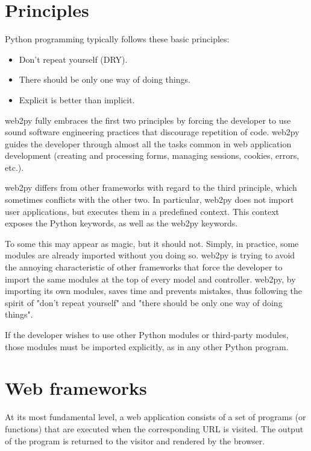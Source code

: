 \documentclass[justified,sixbynine,notoc]{tufte-book}
\def\inxx#1{\index{#1}}
\begin{document}
\begin{fullwidth}
\goodbreak\section{Principles}

Python programming typically follows these basic principles:
\begin{itemize}
\item Don't repeat yourself (DRY).

\item There should be only one way of doing things.

\item Explicit is better than implicit.
\end{itemize}
\noindent web2py fully embraces the first two principles by forcing the developer to use sound software
engineering practices that discourage repetition of code. web2py guides the developer through almost
all the tasks common in web application development (creating and processing forms, managing
sessions, cookies, errors, etc.).

\inxx{request}
web2py differs from other frameworks with regard to the third principle, which sometimes conflicts
with the other two. In particular, web2py does not import user applications, but executes them in a predefined context.  This context exposes the Python keywords, as well as the web2py keywords.

To some this may appear as magic, but it should not.
Simply, in practice, some modules are already imported without you doing so.
web2py is trying to avoid the annoying characteristic of
other frameworks that force the developer to import the same modules at the top of every model and
controller.
\noindent web2py, by importing its own modules, saves time and prevents mistakes, thus following the spirit of "don't repeat yourself"
and "there should be only one way of doing things".

If the developer wishes to use other Python modules or third-party modules, those
modules must be imported explicitly, as in any other Python program.

\goodbreak\section{Web frameworks}

\inxx{PHP} \inxx{ASP} \inxx{JSP}

At its most fundamental level, a web application consists of a set of programs (or functions) that are
executed when the corresponding URL is visited.
The output of the program is returned to the visitor and rendered by the browser.


\end{fullwidth}
\end{document}
